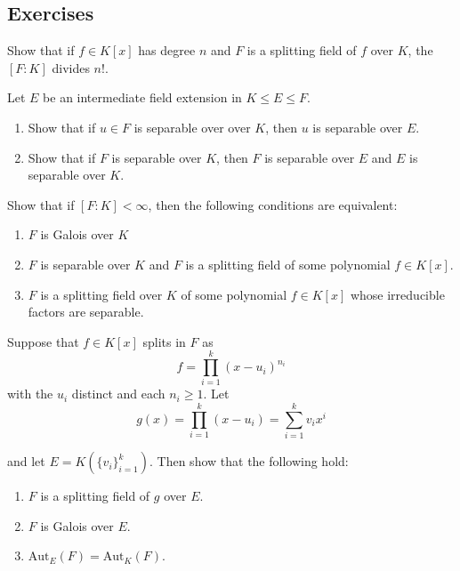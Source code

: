 \subsection{Exercises}

\begin{problem}[Hungerford 5.3.5]
\label{prob:1.1}
Show that if $f\in K[x]$ has degree $n$ and $F$ is a splitting field of $f$ over $K$, the $[F: K]$ divides $n!$.
\end{problem}

\begin{problem}[Hungerford 5.3.12]
\label{prob:1.1}
Let $E$ be an intermediate field extension in $K \leq E \leq F$.
\begin{enumerate}
    \item Show that if $u\in F$ is separable over over $K$, then $u$ is separable over $E$.
    \item Show that if $F$ is separable over $K$, then $F$ is separable over $E$ and $E$ is separable over $K$.
\end{enumerate}
\end{problem}

\begin{problem}[Hungerford 5.3.13]
\label{prob:1.1}
Show that if $[F: K] < \infty$, then the following conditions are equivalent:
\begin{enumerate}
    \item $F$ is Galois over $K$
    \item $F$ is separable over $K$ and $F$ is a splitting field of some polynomial $f\in K[x]$.
    \item $F$ is a splitting field over $K$ of some polynomial $f\in K[x]$ whose irreducible factors are separable.
\end{enumerate}
\end{problem}

\begin{problem}[Hungerford 5.4.1]
\label{prob:1.1}
Suppose that $f\in K[x]$ splits in $F$ as
$$
f = \prod_{i=1}^k (x-u_i)^{n_i}
$$
with the $u_i$ distinct and each $n_i \geq 1$. Let 
$$
g(x) = \prod_{i=1}^k (x-u_i) = \sum_{i=1}^k v_i x^i
$$

and let $E  = K(\{v_i\}_{i=1}^k)$. Then show that the following hold:
\begin{enumerate}
    \item $F$ is a splitting field of $g$ over $E$.
    \item $F$ is Galois over $E$.
    \item $\mathrm{Aut}_E(F) = \mathrm{Aut}_K(F)$.
\end{enumerate}
\end{problem}


